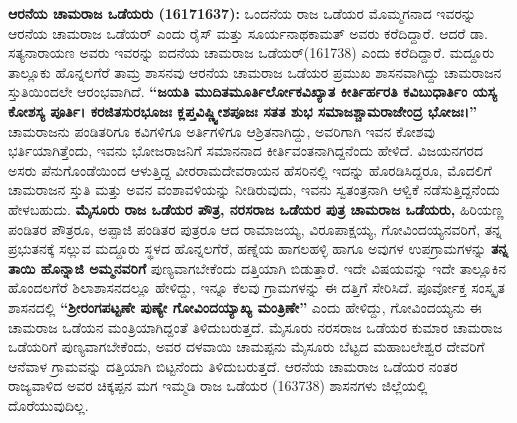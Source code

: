 \textbf{ ಆರನೆಯ ಚಾಮರಾಜ ಒಡೆಯರು (1617\general{\enginline{-}}1637): } ಒಂದನೆಯ ರಾಜ ಒಡೆಯರ ಮೊಮ್ಮಗನಾದ ಇವರನ್ನು ಆರನೆಯ ಚಾಮರಾಜ ಒಡೆಯರ್​ ಎಂದು ರೈಸ್​ ಮತ್ತು ಸೂರ್ಯನಾಥಕಾಮತ್​ ಅವರು ಕರೆದಿದ್ದಾರೆ. ಆದರೆ ಡಾ. ಸತ್ಯನಾರಾಯಣ ಅವರು ಇವರನ್ನು ಐದನೆಯ ಚಾಮರಾಜ ಒಡೆಯರ್​(1617\enginline{-}38) ಎಂದು ಕರೆದಿದ್ದಾರೆ. ಮದ್ದೂರು ತಾಲ್ಲೂಕು ಹೊನ್ನಲಗೆರೆ ತಾಮ್ರ ಶಾಸನವು ಆರನೆಯ ಚಾಮರಾಜ ಒಡೆಯರ ಪ್ರಮುಖ ಶಾಸನವಾಗಿದ್ದು ಚಾಮರಾಜನ ಸ್ತುತಿಯಿಂದಲೇ ಆರಂಭವಾಗಿದೆ. \textbf{“ಜಯತಿ ಮುದಿತಮೂರ್ತಿರ್ಲೋಕವಿಖ್ಯಾತ ಕೀರ್ತಿರ್ಹರತಿ ಕವಿಬುಧಾರ್ತಿಂ ಯಸ್ಯ ಕೋಶಸ್ಯ ಪೂರ್ತಿ। ಕರಜಿತಸುರಭೂಜಃ ಕ್ಲಪ್ತವಿಷ್ಣ್ವೀಶಪೂಜಃ ಸತತ ಶುಭ ಸಮಾಜಶ್ಚಾಮರಾಜೇಂದ್ರ ಭೋಜಃ।”} ಚಾಮರಾಜನು ಪಂಡಿತರಿಗೂ ಕವಿಗಳಿಗೂ ಅರ್ತಿಗಳಿಗೂ ಆಶ್ರಿತನಾಗಿದ್ದು, ಅವರಿಗಾಗಿ ಇವನ ಕೋಶವು ಭರ್ತಿಯಾಗಿತ್ತೆಂದು, ಇವನು ಭೋಜರಾಜನಿಗೆ ಸಮಾನನಾದ ಕೀರ್ತಿವಂತನಾಗಿದ್ದನೆಂದು ಹೇಳಿದೆ. ವಿಜಯನಗರದ ಅಸರು ಪೆನುಗೊಂಡೆಯಿಂದ ಆಳುತ್ತಿದ್ದ ವೀರರಾಮದೇವರಾಯನ ಹೆಸರಿನಲ್ಲಿ ಇದನ್ನು ಹೊರಡಿಸಿದ್ದರೂ, ಮೊದಲಿಗೆ ಚಾಮರಾಜನ ಸ್ತುತಿ ಮತ್ತು ಅವನ ವಂಶಾವಳಿಯನ್ನು ನೀಡಿರುವುದು, ಇವನು ಸ್ವತಂತ್ರನಾಗಿ ಆಳ್ವಿಕೆ ನಡೆಸುತ್ತಿದ್ದನೆಂದು ಹೇಳಬಹುದು. \textbf{ಮೈಸೂರು ರಾಜ ಒಡೆಯರ ಪೌತ್ರ, ನರಸರಾಜ ಒಡೆಯರ ಪುತ್ರ ಚಾಮರಾಜ ಒಡೆಯರು,} ಹಿರಿಯಣ್ಣ ಪಂಡಿತರ ಪೌತ್ರರೂ, ಅಪ್ಪಾಜಿ ಪಂಡಿತರ ಪುತ್ರರೂ ಆದ ರಾಮಾಜಯ್ಯ, ವಿರೂಪಾಕ್ಷಯ್ಯ, ಗೋವಿಂದಯ್ಯನವರಿಗೆ, ತನ್ನ ಪ್ರಭುತನಕ್ಕೆ ಸಲ್ಲುವ ಮದ್ದೂರು ಸ್ಥಳದ ಹೊನ್ನಲಗೆರೆ, ಹಣ್ನೆಯ ಹಾಗಲಹಳ್ಳಿ ಹಾಗೂ ಅವುಗಳ ಉಪಗ್ರಾಮಗಳನ್ನು \textbf{ತನ್ನ ತಾಯಿ ಹೊನ್ನಾಜಿ ಅಮ್ಮನವರಿಗೆ} ಪುಣ್ಯವಾಗಬೇಕೆಂದು ದತ್ತಿಯಾಗಿ ಬಿಡುತ್ತಾರೆ. ಇದೇ ವಿಷಯವನ್ನು ಇದೇ ತಾಲ್ಲೂಕಿನ ಹೊಂದಲಗೆರೆ ಶಿಲಾಶಾಸನದಲ್ಲೂ ಹೇಳಿದ್ದು, ಇನ್ನೂ ಕೆಲವು ಗ್ರಾಮಗಳನ್ನು ಈ ದತ್ತಿಗೆ ಸೇರಿಸಿದೆ. ಪೂರ್ವೋಕ್ತ ಸಂಸ್ಕೃತ ಶಾಸನದಲ್ಲಿ \textbf{“ಶ‍್ರೀರಂಗಪಟ್ಟಣೇ ಪುಣ್ಯೇ ಗೋವಿಂದಯ್ಯಾಖ್ಯ ಮಂತ್ರಿಣೇ”} ಎಂದು ಹೇಳಿದ್ದು, ಗೋವಿಂದಯ್ಯನು ಈ ಚಾಮರಾಜ ಒಡೆಯನ ಮಂತ್ರಿಯಾಗಿದ್ದಂತೆ ತಿಳಿದುಬರುತ್ತದೆ. ಮೈಸೂರು ನರಸರಾಜ ಒಡೆಯರ ಕುಮಾರ ಚಾಮರಾಜ ಒಡೆಯರಿಗೆ ಪುಣ್ಯವಾಗಬೇಕೆಂದು, ಅವರ ದಳವಾಯಿ ಚಾಮಪ್ಪನು ಮೈಸೂರು ಬೆಟ್ಟದ ಮಹಾಬಲೇಶ್ವರ ದೇವರಿಗೆ ಆನೆವಾಳ ಗ್ರಾಮವನ್ನು ದತ್ತಿಯಾಗಿ ಬಿಟ್ಟನೆಂದು ತಿಳಿದುಬರುತ್ತದೆ. ಆರನೆಯ ಚಾಮರಾಜ ಒಡೆಯರ ನಂತರ ರಾಜ್ಯವಾಳಿದ ಅವರ ಚಿಕ್ಕಪ್ಪನ ಮಗ ಇಮ್ಮಡಿ ರಾಜ ಒಡೆಯರ (1637\enginline{-}38) ಶಾಸನಗಳು ಜಿಲ್ಲೆಯಲ್ಲಿ ದೊರೆಯುವುದಿಲ್ಲ.

